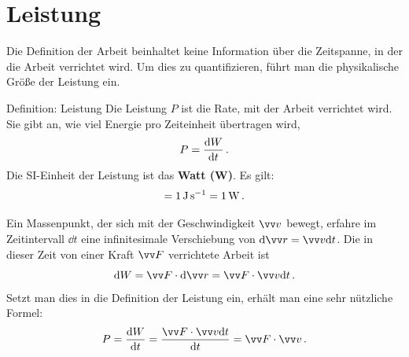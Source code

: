 \section{Leistung}\label{sec: leistung}
Die Definition der Arbeit beinhaltet keine Information über die Zeitspanne, in der die Arbeit verrichtet wird. Um dies zu quantifizieren, führt man die physikalische Größe der Leistung ein.

\begin{rememberbox}[]{Definition: Leistung}
    Die Leistung $P$ ist die Rate, mit der Arbeit verrichtet wird. Sie gibt an, wie viel Energie pro Zeiteinheit übertragen wird,
    \begin{equation}\label{eq: leistung_def}
        P = \frac{\mathrm{d} W}{\mathrm{d} t} \,.
    \end{equation}
    Die SI-Einheit der Leistung ist das \textbf{Watt (W)}. Es gilt:
    \begin{equation}
        [P] = \SI{1}{\joule\per\second} = \SI{1}{\watt} \mDot
    \end{equation}
\end{rememberbox}

Ein Massenpunkt, der sich mit der Geschwindigkeit $\ivec{v}$ bewegt, erfahre im Zeitintervall $\dd t$ eine infinitesimale Verschiebung von $\dd\ivec{r} = \ivec{v}\dd t$. Die in dieser Zeit von einer Kraft $\ivec{F}$ verrichtete Arbeit ist 
\begin{equation}
    \dd W = \ivec{F} \cdot \dd\ivec{r} = \ivec{F} \cdot \ivec{v}\dd t \mDot
\end{equation} 
Setzt man dies in die Definition der Leistung ein, erhält man eine sehr nützliche Formel: 
\begin{equation}\label{eq: leistung_vektoriell}
    P = \frac{\dd W}{\dd t} = \frac{\ivec{F} \cdot \ivec{v}\dd t}{\dd t} = \ivec{F} \cdot \ivec{v} \mDot
\end{equation}

